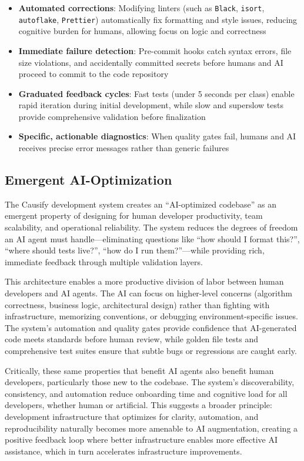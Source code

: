 \begin{itemize}
  \item \textbf{Automated corrections}: Modifying linters (such as
    \texttt{Black}, \texttt{isort}, \texttt{autoflake}, \texttt{Prettier})
    automatically fix formatting and style issues, reducing cognitive
    burden for humans, allowing focus on logic and correctness

  \item \textbf{Immediate failure detection}: Pre-commit hooks catch
    syntax errors, file size violations, and accidentally committed
    secrets before humans and AI proceed to commit to the code repository

  \item \textbf{Graduated feedback cycles}: Fast tests (under 5 seconds
    per class) enable rapid iteration during initial development, while
    slow and superslow tests provide comprehensive validation before
    finalization

  \item \textbf{Specific, actionable diagnostics}: When quality gates fail,
    humans and AI receives precise error messages rather than generic failures
\end{itemize}

\subsection{Emergent AI-Optimization}

The Causify development system creates an ``AI-optimized codebase''
as an emergent property of designing for human developer productivity, team
scalability, and operational reliability. The system reduces the degrees of
freedom an AI agent must handle—eliminating questions like ``how should I
format this?'', ``where should tests live?'', ``how do I run them?''—while
providing rich, immediate feedback through multiple validation layers.

This architecture enables a more productive division of labor between
human developers and AI agents. The AI can focus on higher-level concerns
(algorithm correctness, business logic, architectural design) rather
than fighting with infrastructure, memorizing conventions, or debugging
environment-specific issues. The system's automation and quality gates
provide confidence that AI-generated code meets standards before human
review, while golden file tests and comprehensive test suites ensure
that subtle bugs or regressions are caught early.

Critically, these same properties that benefit AI agents also benefit
human developers, particularly those new to the codebase. The system's
discoverability, consistency, and automation reduce onboarding time
and cognitive load for all developers, whether human or artificial.
This suggests a broader principle: development infrastructure that
optimizes for clarity, automation, and reproducibility naturally becomes
more amenable to AI augmentation, creating a positive feedback loop where
better infrastructure enables more effective AI assistance, which in
turn accelerates infrastructure improvements.
